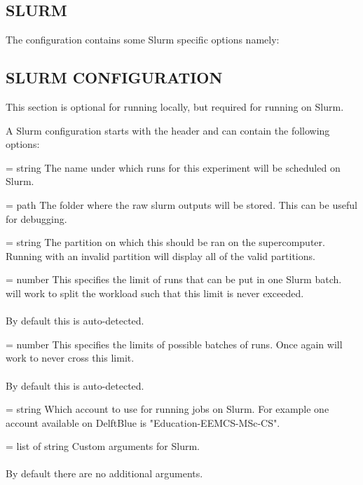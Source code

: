 \documentclass[a4paper,english]{article}
\begin{document}
\begin{adjustwidth}{18pt}{0pt}
    \section{SLURM}

      The configuration contains some Slurm specific options namely:

      \subsection{SLURM CONFIGURATION}

          This section is optional for running locally, but required
          for running on Slurm.

          A Slurm configuration starts with the header \Arg{[slurm]}
          and can contain the following options:

          \begin{Description}[Options]\setlength{\itemsep}{0cm}
              \item[\Opt{experiment\_name} = string]
                The name under which runs for this experiment will be scheduled
                on Slurm.
              \item[\Opt{output\_folder} = path]
                The folder where the raw slurm outputs will be stored. This can be useful
                for debugging.
              \item[\Opt{partition} = string]
                The partition on which this should be ran on the supercomputer.
                Running    with an invalid partition
                will display all of the valid partitions.
              \item[\Opt{array\_size\_limit?} = number]
                This specifies the limit of runs that can be put in one Slurm batch.
                 will work to split the workload such that this limit
                is never exceeded. \\ \\
                By default this is auto-detected.
              \item[\Opt{max\_submit?} = number]
                This specifies the limits of possible batches of runs.
                Once again  will work to never cross this limit. \\ \\
                By default this is auto-detected.
              \item[\Opt{account} = string]
                Which account to use for running jobs on Slurm.
                For example one account available on DelftBlue is "Education-EEMCS-MSc-CS".
              \item[\Opt{additional\_args?} = list of string]
                Custom arguments for Slurm. \\ \\
                By default there are no additional arguments.
          \end{Description}


\end{adjustwidth}
\end{document}
